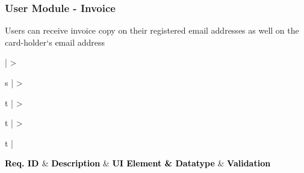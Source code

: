 \documentclass[hidelinks,a4paper,12pt]{article}
\begin{document}
\subsubsection{User Module - Invoice}
Users can receive invoice copy on their registered email addresses as well on the card-holder`s email address

\begin{center}
	{
	\setlength{\extrarowheight}{2pt}

	\newcolumntype{b}{X}
		
	\renewcommand\thetable{2} 					
	 \label{table:2}
	\vspace{0.25cm}
									
	\begin{tabularx}{\textwidth}{ | >{\ttfamily\raggedright\arraybackslash} s 
	| >{\ttfamily\raggedright\arraybackslash} t 
	| >{\ttfamily\raggedright\arraybackslash} t 	
	| >{\ttfamily\raggedright\arraybackslash} t | }
								
	\hline
								
	{\textbf{\textcolor{black}{ {Req. ID} \newline}}} & {\textbf{\textcolor{black}{ { Description}}}} & {\textbf{\textcolor{black}{ {UI Element \& Datatype}}}} & \textbf{\textcolor{black}{ {Validation}}} \\
								

\end{tabularx}}
\end{center}
\end{document}
